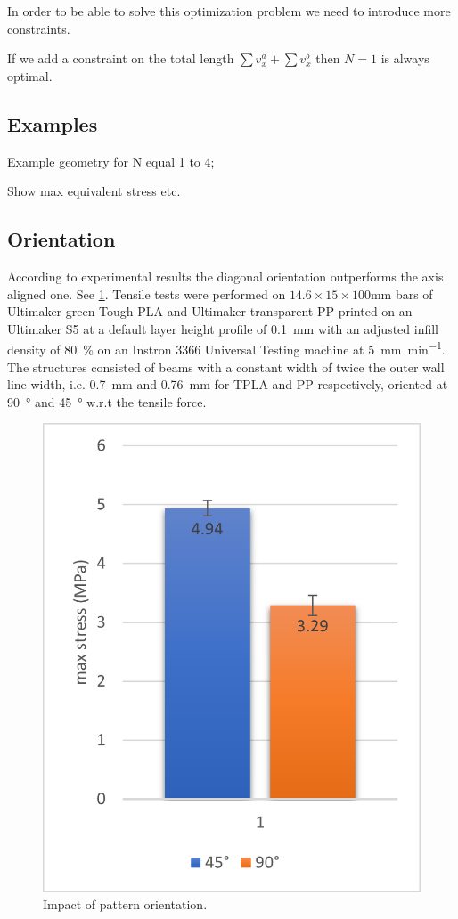 In order to be able to solve this optimization problem we need to introduce more constraints.

If we add a constraint on the total length $\sum v^a_x + \sum v^b_x$ then $N=1$ is always optimal.











\subsection{Examples}
Example geometry for N equal 1 to 4;

Show max equivalent stress etc.


\subsection{Orientation}
According to experimental results the diagonal orientation outperforms the axis aligned one.
See \cref{graph:45vs90}.
Tensile tests were performed on $14.6\times15\times100$\si{\milli\meter} bars of Ultimaker green Tough PLA and Ultimaker transparent PP
printed on an Ultimaker S5 at a default layer height profile of \SI{0.1}{\milli\meter} with an adjusted infill density of \SI{80}{\percent}
on an Instron 3366 Universal Testing machine at \SI{5}{\milli\meter\per\minute}.
The structures consisted of beams with a constant width of twice the outer wall line width, i.e. \SI{0.7}{\milli\meter} and \SI{0.76}{\milli\meter} for TPLA and PP respectively,
oriented at \SI{90}{\degree} and \SI{45}{\degree} w.r.t the tensile force.

\begin{figure}
	\centering
	\includegraphics[width=.5\columnwidth]{sources/testing/45vs90.png}
	\caption{Impact of pattern orientation.}
	\label{graph:45vs90}
\end{figure}


